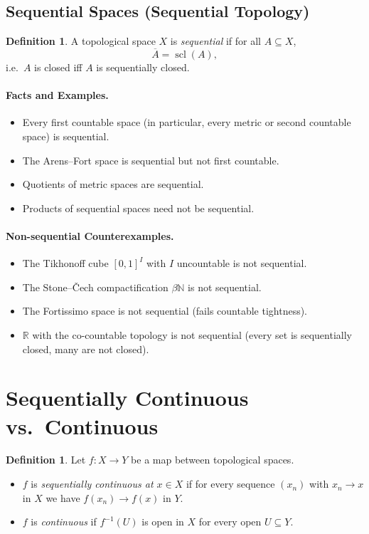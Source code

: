 \documentclass[12pt,a4paper]{article}
\theoremstyle{plain}
\theoremstyle{definition}
\newtheorem{definition}[theorem]{Definition}
\theoremstyle{remark}
\theoremstyle{remark}
\begin{document}
	\subsection*{Sequential Spaces (Sequential Topology)}
	\begin{definition}
		A topological space $X$ is \emph{sequential} if for all $A\subseteq X$,
		\[
		\overline{A}=\operatorname{scl}(A),
		\]
		i.e.\ $A$ is closed iff $A$ is sequentially closed.
	\end{definition}
	
	\paragraph{Facts and Examples.}
	\begin{itemize}
		\item Every first countable space (in particular, every metric or second countable space) is sequential.
		\item The Arens--Fort space is sequential but not first countable.
		\item Quotients of metric spaces are sequential.
		\item Products of sequential spaces need not be sequential.
	\end{itemize}
	
	\paragraph{Non-sequential Counterexamples.}
	\begin{itemize}
		\item The Tikhonoff cube $[0,1]^I$ with $I$ uncountable is not sequential.
		\item The Stone--\v{C}ech compactification $\beta\mathbb{N}$ is not sequential.
		\item The Fortissimo space is not sequential (fails countable tightness).
		\item $\mathbb{R}$ with the co-countable topology is not sequential (every set is sequentially closed, many are not closed).
	\end{itemize}
	
	
	\section*{Sequentially Continuous vs.\ Continuous}
	
	\begin{definition}
		Let $f:X\to Y$ be a map between topological spaces.
		\begin{itemize}
			\item $f$ is \emph{sequentially continuous at $x\in X$} if for every sequence $(x_n)$ with $x_n\to x$ in $X$ we have $f(x_n)\to f(x)$ in $Y$.
			\item $f$ is \emph{continuous} if $f^{-1}(U)$ is open in $X$ for every open $U\subseteq Y$.
		\end{itemize}
	\end{definition}
	
\end{document}
